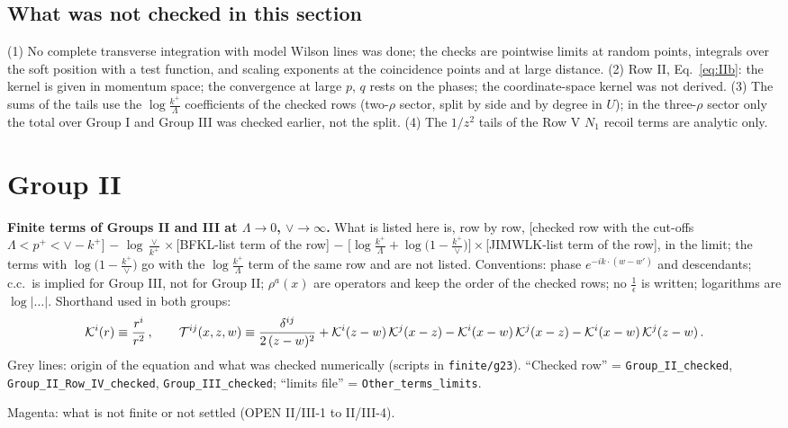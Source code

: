 \documentclass[9pt]{article}
\numberwithin{equation}{section}
\begin{document}
\subsection{What was not checked in this section}
\noindent (1) No complete transverse integration with model Wilson lines was done; the checks are pointwise limits at random points, integrals over the soft position with a test function, and scaling exponents at the coincidence points and at large distance. (2) Row II, Eq.~\eqref{eq:IIb}: the kernel is given in momentum space; the convergence at large $p$, $q$ rests on the phases; the coordinate-space kernel was not derived. (3) The sums of the tails use the $\log\frac{k^{+}}{\Lambda}$ coefficients of the checked rows (two-$\rho$ sector, split by side and by degree in $U$); in the three-$\rho$ sector only the total over Group I and Group III was checked earlier, not the split. (4) The $1/z^{2}$ tails of the Row V $N_{1}$ recoil terms are analytic only.

\section{Group II}
\noindent\textbf{Finite terms of Groups II and III at $\Lambda\to0$, $\vee\to\infty$.} What is listed here is, row by row, [checked row with the cut-offs $\Lambda<p^{+}<\vee-k^{+}$] $-$ $\log\frac{\vee}{k^{+}}\times$[BFKL-list term of the row] $-$ $\big[\log\frac{k^{+}}{\Lambda}+\log\big(1-\frac{k^{+}}{\vee}\big)\big]\times$[JIMWLK-list term of the row], in the limit; the terms with $\log\big(1-\frac{k^{+}}{\vee}\big)$ go with the $\log\frac{k^{+}}{\Lambda}$ term of the same row and are not listed. Conventions: phase $e^{-ik\cdot(w-w')}$ and descendants; c.c.\ is implied for Group III, not for Group II; $\rho^{a}(x)$ are operators and keep the order of the checked rows; no $\frac{1}{\epsilon}$ is written; logarithms are $\log|\dots|$. Shorthand used in both groups:
\begin{align}
\mathcal{K}^{i}(r)\equiv\frac{r^{i}}{r^{2}}\,,\qquad
\mathcal{T}^{ij}(x,z,w)\equiv\frac{\delta^{ij}}{2\,(z-w)^{2}}+\mathcal{K}^{i}(z-w)\,\mathcal{K}^{j}(x-z)-\mathcal{K}^{i}(x-w)\,\mathcal{K}^{j}(x-z)-\mathcal{K}^{i}(x-w)\,\mathcal{K}^{j}(z-w)\,.\notag
\end{align}
{\color{gray}\small Grey lines: origin of the equation and what was checked numerically (scripts in \texttt{finite/g23}). ``Checked row'' = \texttt{Group\_II\_checked}, \texttt{Group\_II\_Row\_IV\_checked}, \texttt{Group\_III\_checked}; ``limits file'' = \texttt{Other\_terms\_limits}.}\par
{\color{magenta}Magenta: what is not finite or not settled (OPEN II/III-1 to II/III-4).}
\end{document}
